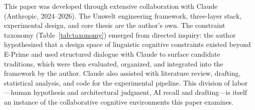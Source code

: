 \documentclass[11pt,a4paper]{article}
\begin{document}
This paper was developed through extensive collaboration with Claude (Anthropic, 2024--2026). The Umwelt engineering framework, three-layer stack, experimental design, and core thesis are the author's own. The constraint taxonomy (Table~\ref{tab:taxonomy}) emerged from directed inquiry: the author hypothesized that a design space of linguistic cognitive constraints existed beyond E-Prime and used structured dialogue with Claude to surface candidate traditions, which were then evaluated, organized, and integrated into the framework by the author. Claude also assisted with literature review, drafting, statistical analysis, and code for the experimental pipeline. This division of labor---human hypothesis and architectural judgment, AI recall and drafting---is itself an instance of the collaborative cognitive environments this paper examines.
\end{document}
